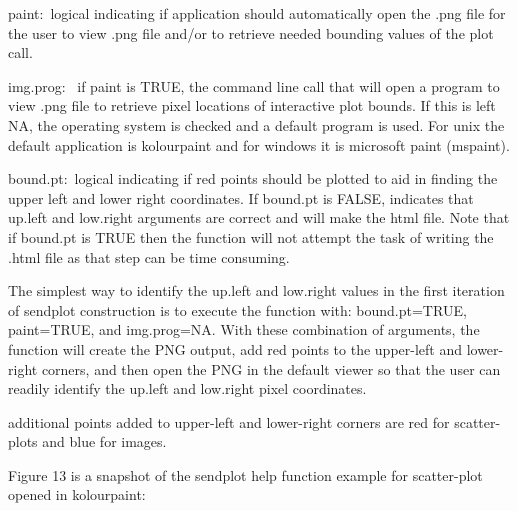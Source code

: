\documentclass[]{article}
\begin{document}
\begin{description}
 \item{paint:~}{logical indicating if application should
    automatically open the .png file for the user to view .png file and/or
    to retrieve needed bounding values of the plot call.}

  \item{img.prog:~ }{if paint is TRUE, the command line call that will open
    a program to view .png file to retrieve pixel locations of interactive
    plot bounds. If this is left NA, the operating system is checked and
    a default program is used. For unix the default application is
    kolourpaint and for windows it is microsoft paint (mspaint).}

  \item{bound.pt:~}{logical indicating if red points should be plotted to
    aid in finding the upper left and lower right coordinates. If
    bound.pt is FALSE, indicates that up.left and low.right arguments
    are correct and will make the html file. Note that if bound.pt is TRUE then the function will not
    attempt the task of writing the .html file as that step can be time consuming.}

 \end{description}
The simplest way to identify the up.left and low.right values in the first iteration of sendplot construction is to execute the function with: bound.pt=TRUE, paint=TRUE, and img.prog=NA. With these combination of arguments, the function will create the PNG output, add red points to the upper-left and lower-right corners, and then open the PNG in the default viewer so that the user can readily identify the up.left and low.right pixel coordinates. 

 additional points added to upper-left and lower-right corners are red for scatter-plots and blue for 
images. \newline

 \indent Figure 13 is a snapshot of the sendplot help function example for scatter-plot opened in kolourpaint:
\end{document}
